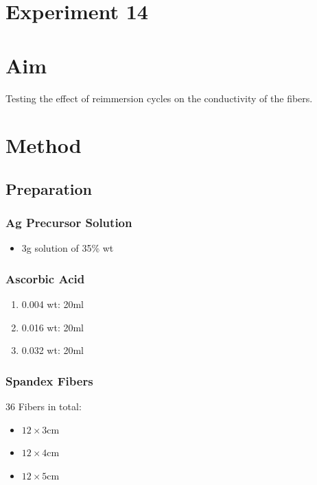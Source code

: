 \documentclass{article}
\begin{document}
\section*{Experiment 14}

\section{Aim}
Testing the effect of reimmersion cycles on the conductivity of the fibers.

\section{Method}
\subsection{Preparation}
\subsubsection{Ag Precursor Solution}
\begin{itemize}
    \item  3g solution of  35\% wt
\end{itemize}

\subsubsection{Ascorbic Acid}
\begin{enumerate}
    \item 0.004 wt: 20ml
    \item 0.016 wt: 20ml
    \item 0.032 wt: 20ml
\end{enumerate}

\subsubsection{Spandex Fibers}
36 Fibers in total:
\begin{itemize}
    \item $12\times 3$cm
    \item $12\times 4$cm
    \item $12\times 5$cm
\end{itemize}
\end{document}
